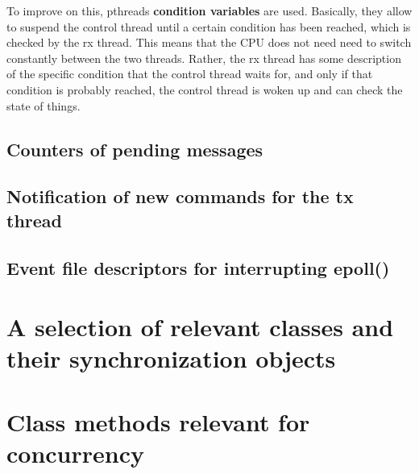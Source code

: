 \documentclass[fontsize=12,a4paper]{scrartcl}
\begin{document}
To improve on this, pthreads \textbf{condition variables} are used.
Basically, they allow to suspend the control thread until a certain
condition has been reached, which is checked by the rx thread. This
means that the CPU does not need need to switch constantly between the
two threads. Rather, the rx thread has some description of the
specific condition that the control thread waits for, and only if that
condition is probably reached, the control thread is woken up and can
check the state of things.

\subsection{Counters of pending messages}

\subsection{Notification of new commands for the tx thread}

\subsection{Event file descriptors for interrupting epoll()}

\section{A selection of relevant classes and their synchronization objects}

\appendix

\section{Class methods relevant for concurrency}
\end{document}
